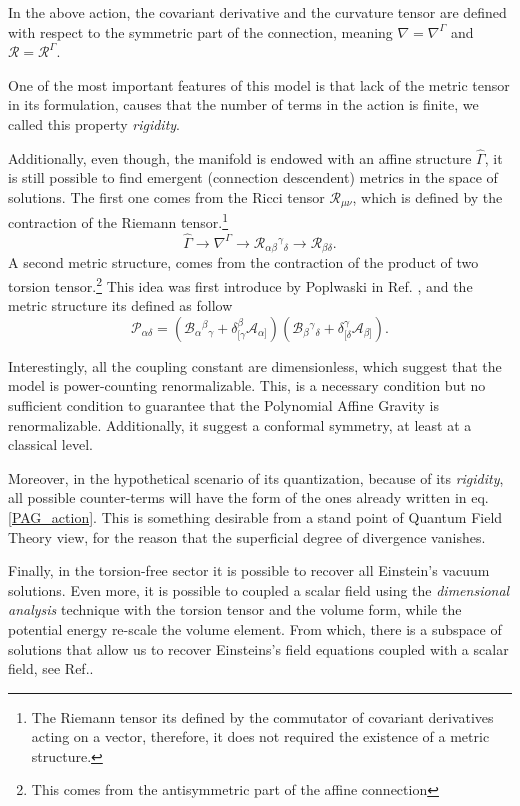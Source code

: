 \documentclass{article}
\providecommand{\Rie}[3]{\mathcal{R}_{#1}{}^{ #2}{}_{#3}}
\providecommand{\B}[3]{\mathcal{B}_{#1}{}^{ #2}{}_{#3}}
\providecommand{\A}[1]{\mathcal{A}_{#1}}
\providecommand{\Ri}[1]{\mathcal{R}_{#1}}
\begin{document}
In the above action, the covariant derivative and the curvature tensor are defined
with respect to the symmetric part of the connection, meaning $\nabla = \nabla^{\Gamma}$ 
and $\mathcal{R} = \mathcal{R}^{\Gamma}$. 

One of the most important features of this model is that lack of the metric tensor 
in its formulation, causes that the number of terms in the action is finite, we called
this property \textit{rigidity}.

Additionally, even though, the manifold is endowed with an affine structure $\hat{\Gamma}$, 
it is still possible to find emergent (connection descendent) metrics in the space of 
solutions. The first one comes from the Ricci tensor $\mathcal{R}_{\mu\nu}$, which is 
defined by the contraction of the Riemann tensor.\footnote{The Riemann tensor its defined 
by the commutator of covariant derivatives acting on a vector, therefore, it does not 
required the existence of a metric structure.} 
\begin{equation}
    \label{chain}
    \hat{\Gamma} \to \nabla^{\Gamma} \to \Rie{\alpha\beta}{\gamma}{\delta} \to \Ri{\beta\delta}.
\end{equation}
A second metric structure, comes from the contraction of the product of two torsion tensor.\footnote{This comes
from the antisymmetric part of the affine connection} This idea was first introduce by Poplwaski in Ref. \cite{Pop_awski_2013},
and the metric structure its defined as follow
\begin{dmath}
    \mathcal{P}_{\alpha\delta} = \left(\B{\alpha}{\beta}{\gamma} + \delta^{\beta}_{[\gamma}\A{\alpha]}\right)\left(\B{\beta}{\gamma}{\delta} + \delta^{\gamma}_{[\delta}\A{\beta]}\right).
\end{dmath}

Interestingly, all the coupling constant are dimensionless, which suggest that the model is power-counting renormalizable. This,
is a necessary condition but no sufficient condition to guarantee that the Polynomial Affine Gravity is renormalizable. Additionally,
it suggest a conformal symmetry, at least at a classical level.

Moreover, in the hypothetical scenario of its quantization, because of its \textit{rigidity}, all possible counter-terms
will have the form of the ones already written in eq.\eqref{PAG_action}. This is something desirable from a stand point
of Quantum Field Theory view, for the reason that the superficial degree of divergence vanishes.

Finally, in the torsion-free sector it is possible to recover all Einstein's vacuum solutions. Even more, it is possible
to coupled a scalar field using the \textit{dimensional analysis} technique with the torsion tensor and the volume form,
while the potential energy re-scale the volume element. From which, there is a subspace of solutions that allow us to 
recover Einsteins's field equations coupled with a scalar field, see Ref.\cite{castillofelisola2023inflationary}.
\end{document}
